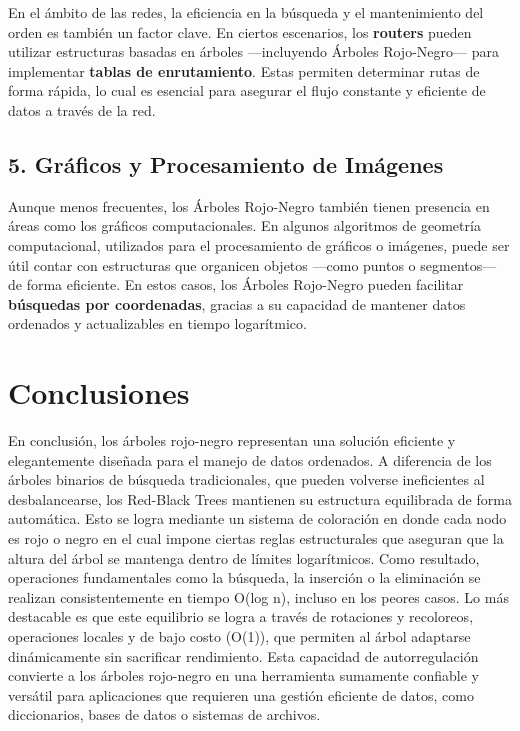 \documentclass[conference]{IEEEtran}
\begin{document}
En el ámbito de las redes, la eficiencia en la búsqueda y el mantenimiento del orden es también un factor clave.  
En ciertos escenarios, los \textbf{routers} pueden utilizar estructuras basadas en árboles —incluyendo Árboles Rojo-Negro— para implementar \textbf{tablas de enrutamiento}. Estas permiten determinar rutas de forma rápida, lo cual es esencial para asegurar el flujo constante y eficiente de datos a través de la red.

\subsection*{5. Gráficos y Procesamiento de Imágenes}

Aunque menos frecuentes, los Árboles Rojo-Negro también tienen presencia en áreas como los gráficos computacionales.  
En algunos algoritmos de geometría computacional, utilizados para el procesamiento de gráficos o imágenes, puede ser útil contar con estructuras que organicen objetos —como puntos o segmentos— de forma eficiente. En estos casos, los Árboles Rojo-Negro pueden facilitar \textbf{búsquedas por coordenadas}, gracias a su capacidad de mantener datos ordenados y actualizables en tiempo logarítmico.




\section{Conclusiones}
En conclusión, los árboles rojo-negro representan una solución eficiente y elegantemente diseñada para el manejo de datos ordenados. A diferencia de los árboles binarios de búsqueda tradicionales, que pueden volverse ineficientes al desbalancearse, los Red-Black Trees mantienen su estructura equilibrada de forma automática. Esto se logra mediante un sistema de coloración en donde cada nodo es rojo o negro en el cual impone ciertas reglas estructurales que aseguran que la altura del árbol se mantenga dentro de límites logarítmicos. Como resultado, operaciones fundamentales como la búsqueda, la inserción o la eliminación se realizan consistentemente en tiempo O(log n), incluso en los peores casos. Lo más destacable es que este equilibrio se logra a través de rotaciones y recoloreos, operaciones locales y de bajo costo (O(1)), que permiten al árbol adaptarse dinámicamente sin sacrificar rendimiento. Esta capacidad de autorregulación convierte a los árboles rojo-negro en una herramienta sumamente confiable y versátil para aplicaciones que requieren una gestión eficiente de datos, como diccionarios, bases de datos o sistemas de archivos.
\end{document}
